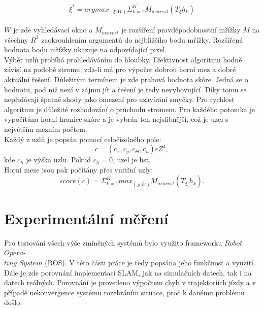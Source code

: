 \documentclass[12pt]{report}
\begin{document}
\begin{equation}
\xi^*=argmax_{(\xi\epsilon W)}\Sigma_{k=1}^KM_{nearest}(T_{\xi}h_k)
\end{equation}\\
$W$ je zde vyhledávací okno a $M_{nearest}$ je rozšíření pravděpodobnostní mřížky $M$ na všechny $R^2$ zaokrouhlením argumentů do nejbližšího bodu mřížky. Rozšířená hodnota bodu mřížky ukazuje na odpovídající pixel.\\
\indent Výběr uzlů probíhá prohledáváním do hloubky. Efektivnost algoritmu hodně závisí na podobě stromu, zda-li má pro výpočet dobrou horní mez a dobré aktuální řešení. Důležitým termínem je zde prahová hodnota skóre. Jedná se o hodnotu, pod níž není v zájmu jít a řešení je tedy nevyhovující. Díky tomu se nepřidávají špatné shody jako omezení pro uzavírání smyčky. Pro rychlost algoritmu je důležité rozhodování o průchodu stromem. Pro každého potomka je vypočítána horní hranice skóre a je vybrán ten nejslibnější, což je uzel s největším mezním počtem.\\
\indent Každý z uzlů je popsán pomocí celočíselného pole: 
\begin{equation}
c=(c_x,c_y,c_\Theta,c_h)\epsilon Z^4,
\end{equation}
kde $c_h$ je výška uzlu. Pokud $c_h=0$, uzel je list.\\
\indent Horní meze jsou pak počítány přes vnitřní uzly: 
\begin{equation}
score(c)=\Sigma_{k=1}^Kmax_{(j\epsilon \bar{W})}M_{nearest}(T_{\xi_j}h_k).
\end{equation}

\newpage

\chapter{Experimentální měření}
Pro testování všech výše zmíněných systémů bylo využito frameworku $Robot$ $Opera$-\\$ting$ $System$ (ROS). V této části práce je tedy popsána jeho funkčnost a využití. Dále je zde porovnání implementací SLAM, jak na simulačních datech, tak i na datech reálných. Porovnání je provedeno výpočtem chyb v trajektoriích jízdy a v případě nekonvergence systému rozebráním situace, proč k danému problému došlo.
\end{document}
